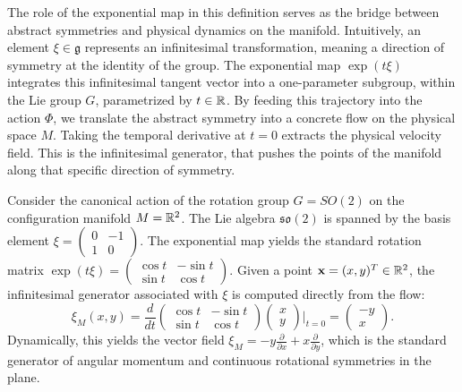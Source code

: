 \begin{remark}
	The role of the exponential map in this definition serves as the bridge between abstract symmetries and physical dynamics on the manifold. Intuitively, an element $\xi \in \mathfrak{g}$ represents an infinitesimal transformation, meaning a direction of symmetry at the identity of the group. The exponential map $\exp(t\xi)$ integrates this infinitesimal tangent vector into a one-parameter subgroup, within the Lie group $G$, parametrized by $t \in \mathbb{R}$. By feeding this trajectory into the action $\Phi$, we translate the abstract symmetry into a concrete flow on the physical space $M$. Taking the temporal derivative at $t=0$ extracts the physical velocity field. This is the infinitesimal generator, that pushes the points of the manifold along that specific direction of symmetry.
\end{remark}

\medskip

\begin{example}
	Consider the canonical action of the rotation group $G = SO(2)$ on the configuration manifold $M = \mathbb{R}^2$. The Lie algebra $\mathfrak{so}(2)$ is spanned by the basis element $\xi = \begin{pmatrix} 0 & -1 \\ 1 & 0 \end{pmatrix}$. The exponential map yields the standard rotation matrix $\exp(t\xi) = \begin{pmatrix} \cos t & -\sin t \\ \sin t & \cos t \end{pmatrix}$.
	Given a point $\mathbf{x} = (x, y)^T \in \mathbb{R}^2$, the infinitesimal generator associated with $\xi$ is computed directly from the flow:
	\[
	\xi_M(x,y) = \frac{d}{dt} \begin{pmatrix} \cos t & -\sin t \\ \sin t & \cos t \end{pmatrix} \begin{pmatrix} x \\ y \end{pmatrix} \bigg|_{t=0} = \begin{pmatrix} -y \\ x \end{pmatrix}.
	\]
	Dynamically, this yields the vector field $\xi_M = -y \frac{\partial}{\partial x} + x \frac{\partial}{\partial y}$, which is the standard generator of angular momentum and continuous rotational symmetries in the plane.
\end{example}

